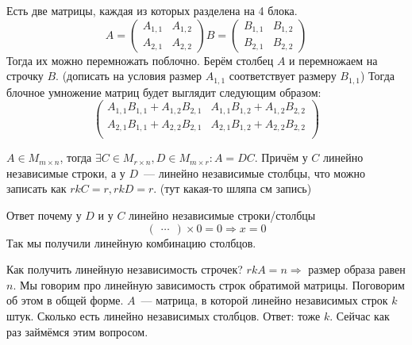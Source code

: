 \begin{definition}
    Есть две матрицы, каждая из которых разделена на 4 блока.
    $$
    A = \left(\begin{array}{c|c}
            A_{1,1} & A_{1,2}\\
            \hline
            A_{2,1} & A_{2,2}
    \end{array}\right)
    B = \left(\begin{array}{c|c}
            B_{1,1} & B_{1,2}\\
            \hline
            B_{2,1} & B_{2,2}
    \end{array}\right)$$
    Тогда их можно перемножать поблочно.
    Берём столбец $A$ и перемножаем на строчку $B$.
    (дописать на условия размер $A_{1,1}$ соответствует размеру $B_{1,1}$)
    Тогда блочное умножение матриц будет выглядит следующим образом:
    $$
    \left(\begin{array}{c|c}
            A_{1,1}B_{1,1} + A_{1,2}B_{2,1} & A_{1,1}B_{1,2} + A_{1,2}B_{2,2}\\
            \hline
            A_{2,1}B_{1,1} + A_{2,2}B_{2,1} & A_{2,1}B_{1,2} + A_{2,2}B_{2,2}\\
    \end{array}\right)
    $$
\end{definition}
\begin{follow}
    $A\in M_{m\times n}$, тогда $\exists C\in M_{r\times n},
    D\in M_{m\times r}: A = DC$. Причём у $C$ линейно независимые строки,
    а у $D$~--- линейно независимые столбцы, что можно записать как $rk C = r, rkD = r$.
    (тут какая-то шляпа см запись)

    Ответ почему у $D$ и у $C$ линейно независимые строки/столбцы
    $$
    \begin{pmatrix}
        \dots
    \end{pmatrix}
    \times 0 = 0 \Rightarrow x = 0
    $$
    Так мы получили линейную комбинацию столбцов.

    Как получить линейную независимость строчек?
    $rkA = n\Rightarrow$ размер образа равен $n$.
    Мы говорим про линейную зависимость строк обратимой матрицы.
    Поговорим об этом в общей форме. 
    $A$~--- матрица, в которой линейно независимых строк $k$ штук.
    Сколько есть линейно независимых столбцов. Ответ: тоже $k$.
    Сейчас как раз займёмся этим вопросом.
\end{follow}
